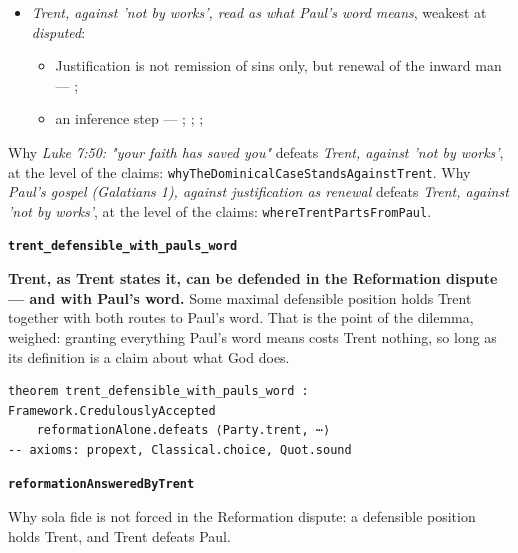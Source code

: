 \documentclass[11pt]{article}
\begin{document}
\begin{itemize}
\begin{itemize}
\item an inference step --- \cite[ad loc. Gal 1:6]{moo-galatians-2013}; \cite[XI.1]{westminster-confession-1647}
\item an inference step --- \cite[XI.1]{westminster-confession-1647}; \cite[III.xi.2]{calvin-institutes-1960}; \cite{morris-apostolic-preaching-1965}
\end{itemize}
\item \emph{Trent, against 'not by works', read as what Paul's word means}, weakest at \emph{disputed}:
\begin{itemize}
\item Justification is not remission of sins only, but renewal of the inward man --- \cite[Trent, Session VI (1547), Decree on Justification, ch. 7]{tanner-decrees-1990}; \cite[Trent, Session VI (1547), canon 11]{tanner-decrees-1990}
\item an inference step --- \cite[Trent, Session VI (1547), Decree on Justification, ch. 8]{tanner-decrees-1990}; \cite[Trent, Session VI (1547), Decree on Justification, ch. 7]{tanner-decrees-1990}; \cite[On the Spirit and the Letter, ch. 45 (26.45)]{npnf1-05-1887}; \cite{mcgrath-iustitia-dei-2005}
\end{itemize}
\end{itemize}
\noindent Why \emph{Luke 7:50: "your faith has saved you"} defeats \emph{Trent, against 'not by works'}, at the level of the claims: \texttt{why\allowbreak{}The\allowbreak{}Dominical\allowbreak{}Case\allowbreak{}Stands\allowbreak{}Against\allowbreak{}Trent}.
\noindent Why \emph{Paul's gospel (Galatians 1), against justification as renewal} defeats \emph{Trent, against 'not by works'}, at the level of the claims: \texttt{where\allowbreak{}Trent\allowbreak{}Parts\allowbreak{}From\allowbreak{}Paul}.
\par\medskip\noindent\textbf{\texttt{trent\_\allowbreak{}defensible\_\allowbreak{}with\_\allowbreak{}pauls\_\allowbreak{}word}}\par\nobreak\noindent
\textbf{Trent, as Trent states it, can be defended in the Reformation dispute — and with Paul's word.} Some maximal defensible position holds Trent together with both routes to Paul's word. That is the point of the dilemma, weighed: granting everything Paul's word means costs Trent nothing, so long as its definition is a claim about what God does.

{\small\begin{verbatim}
theorem trent_defensible_with_pauls_word : Framework.CredulouslyAccepted
    reformationAlone.defeats ⟨Party.trent, ⋯⟩
-- axioms: propext, Classical.choice, Quot.sound
\end{verbatim}}
\par\medskip\noindent\textbf{\texttt{reformation\allowbreak{}Answered\allowbreak{}By\allowbreak{}Trent}}\par\nobreak\noindent
Why sola fide is not forced in the Reformation dispute: a defensible position holds Trent, and Trent defeats Paul.
\end{document}
